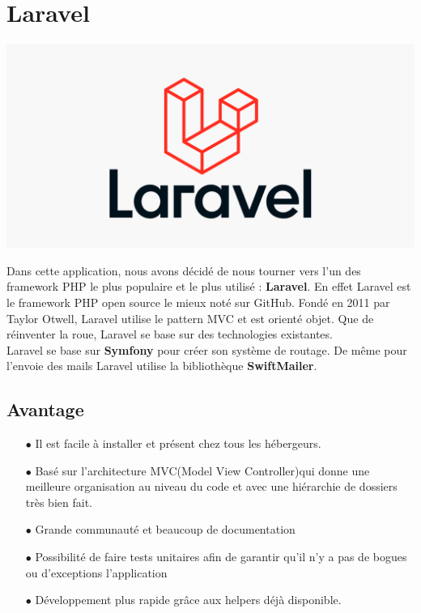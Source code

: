 			\section*{Laravel}
				\begin{center}
					\includegraphics[scale=0.2]{chap_2/laravel.png}
					\label{logo de laravel}
					\cite{logo_laravel}
				\end{center}
			Dans cette application, nous avons décidé de nous tourner vers l'un des framework PHP le plus populaire et le plus utilisé : \textbf{Laravel}.\newline
			En effet Laravel est le framework PHP open source le mieux noté sur GitHub. Fondé en 2011 par Taylor Otwell, Laravel utilise le pattern MVC et est orienté objet.\cite{laravel_1}\newline
			Que de réinventer la roue, Laravel se base sur des technologies existantes.\\
			Laravel se base sur \textbf{Symfony} pour créer son système de routage. De même pour l'envoie des mails Laravel utilise la bibliothèque \textbf{SwiftMailer}.
			\subsection*{Avantage}
				\begin{itemize}
					\item[$\bullet$] Il est facile à installer et présent chez tous les hébergeurs.
					\item[$\bullet$] Basé sur l'architecture MVC(Model View Controller)qui donne une meilleure organisation au niveau du code et avec une hiérarchie de dossiers très bien fait.
					\item[$\bullet$] Grande communauté et beaucoup de documentation
					\item[$\bullet$] Possibilité de faire tests unitaires afin de garantir qu’il n’y a pas de bogues ou d’exceptions l'application
					\item[$\bullet$] Développement plus rapide grâce aux helpers déjà disponible.
				\end{itemize}
